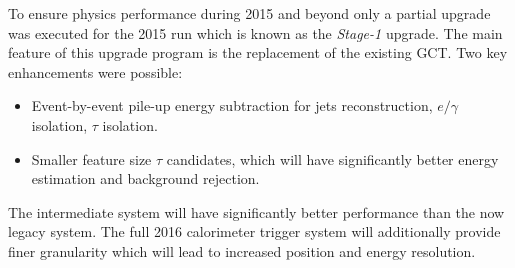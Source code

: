 To ensure physics performance during 2015 and beyond only a partial upgrade was executed for the 2015 run which is known as the \textit{Stage-1} upgrade. The main feature of this upgrade program is the replacement of the existing \gls{GCT}. Two key enhancements were possible: 

\begin{itemize}
  \item Event-by-event pile-up energy subtraction for jets reconstruction, $e/\gamma$ isolation, $\tau$ isolation.
  \item Smaller feature size $\tau$ candidates, which will have significantly better energy estimation and background rejection.
\end{itemize}

The intermediate system will have significantly better performance than the now legacy system. The full 2016 calorimeter trigger system will additionally provide finer granularity which will lead to increased position and energy resolution. 
